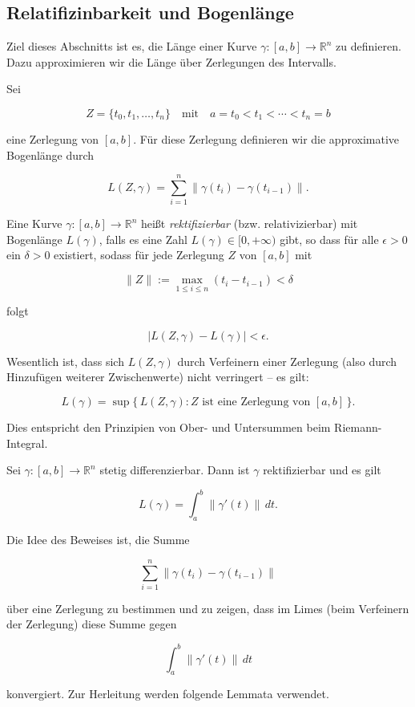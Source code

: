 \subsection{Relatifizinbarkeit und Bogenlänge}

Ziel dieses Abschnitts ist es, die Länge einer Kurve $\gamma: [a,b] \to \mathbb{R}^n$ zu definieren. Dazu approximieren wir die Länge über Zerlegungen des Intervalls.

Sei 


$$
Z = \{t_0, t_1, \dots, t_n\} \quad \text{mit} \quad a = t_0 < t_1 < \cdots < t_n = b
$$


eine Zerlegung von $[a,b]$. Für diese Zerlegung definieren wir die approximative Bogenlänge durch


$$
L(Z,\gamma) = \sum_{i=1}^n \|\gamma(t_i)-\gamma(t_{i-1})\|.
$$



\begin{definition}{}
Eine Kurve $\gamma: [a,b] \to \mathbb{R}^n$ heißt \emph{rektifizierbar} (bzw. relativizierbar) mit Bogenlänge $L(\gamma)$, falls es eine Zahl $L(\gamma)\in [0,+\infty)$ gibt, so dass für alle $\epsilon>0$ ein $\delta>0$ existiert, sodass für jede Zerlegung $Z$ von $[a,b]$ mit 


$$
\|Z\| := \max_{1\le i\le n}(t_i-t_{i-1}) < \delta
$$


folgt


$$
\bigl|L(Z,\gamma)-L(\gamma)\bigr|<\epsilon.
$$


\end{definition}

\begin{bemerkungbox}
Wesentlich ist, dass sich $L(Z,\gamma)$ durch Verfeinern einer Zerlegung (also durch Hinzufügen weiterer Zwischenwerte) nicht verringert – es gilt:


$$
L(\gamma)=\sup\{\,L(Z,\gamma):Z \text{ ist eine Zerlegung von } [a,b]\,\}.
$$


Dies entspricht den Prinzipien von Ober- und Untersummen beim Riemann-Integral.
\end{bemerkungbox}

\begin{satz}{}
Sei $\gamma: [a,b] \to \mathbb{R}^n$ stetig differenzierbar. Dann ist $\gamma$ rektifizierbar und es gilt


$$
L(\gamma)=\int_a^b \|\gamma'(t)\|\,dt.
$$


\end{satz}

\begin{beweisbox}
Die Idee des Beweises ist, die Summe


$$
\sum_{i=1}^n \|\gamma(t_i)-\gamma(t_{i-1})\|
$$


über eine Zerlegung zu bestimmen und zu zeigen, dass im Limes (beim Verfeinern der Zerlegung) diese Summe gegen


$$
\int_a^b \|\gamma'(t)\|\,dt
$$


konvergiert. Zur Herleitung werden folgende Lemmata verwendet.
\end{beweisbox}

